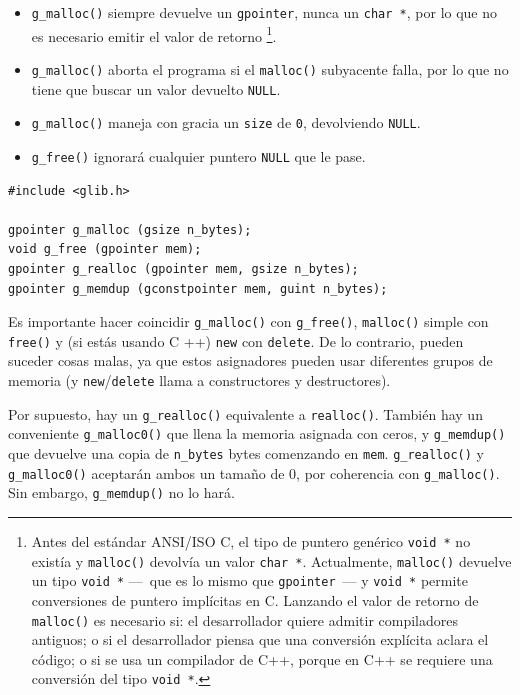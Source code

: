 \begin{itemize}
    \item \lstinline{g_malloc()} siempre devuelve un \lstinline{gpointer}, nunca un \lstinline{char *}, por lo que no es necesario emitir el valor de retorno \footnote{Antes del estándar ANSI/ISO C, el tipo de puntero genérico \lstinline{void *} no existía y \lstinline{malloc()} devolvía un valor \lstinline{char *}. Actualmente, \lstinline{malloc()} devuelve un tipo \lstinline{void *} ---~que es lo mismo que \lstinline{gpointer}~--- y \lstinline{void *} permite conversiones de puntero implícitas en C. Lanzando el valor de retorno de \lstinline{malloc()} es necesario si: el desarrollador quiere admitir compiladores antiguos; o si el desarrollador piensa que una conversión explícita aclara el código; o si se usa un compilador de C++, porque en C++ se requiere una conversión del tipo \lstinline{void *}.}.
    
    \item \lstinline{g_malloc()} aborta el programa si el \lstinline{malloc()} subyacente falla, por lo que no tiene que buscar un valor devuelto \lstinline{NULL}.
    
    \item \lstinline{g_malloc()} maneja con gracia un \lstinline{size} de \lstinline{0}, devolviendo \lstinline{NULL}.
    
    \item \lstinline{g_free()} ignorará cualquier puntero \lstinline{NULL} que le pase.
\end{itemize}

\begin{lstlisting}[style=GLib/GTK, caption={Asignación de memoria GLib}, label=glib-malloc-free]
#include <glib.h>

gpointer g_malloc (gsize n_bytes);
void g_free (gpointer mem);
gpointer g_realloc (gpointer mem, gsize n_bytes);
gpointer g_memdup (gconstpointer mem, guint n_bytes);
\end{lstlisting}

Es importante hacer coincidir \lstinline{g_malloc()} con \lstinline{g_free()}, \lstinline{malloc()} simple con \lstinline{free()} y (si estás usando C ++) \lstinline[style=GLib/GTK]{new} con \lstinline[style=GLib/GTK]{delete}. De lo contrario, pueden suceder cosas malas, ya que estos asignadores pueden usar diferentes grupos de memoria (y \lstinline[style=GLib/GTK]{new}/\lstinline[style=GLib/GTK]{delete} llama a constructores y destructores).

Por supuesto, hay un \lstinline{g_realloc()} equivalente a \lstinline{realloc()}. También hay un conveniente \lstinline{g_malloc0()} que llena la memoria asignada con ceros, y \lstinline{g_memdup()} que devuelve una copia de \lstinline{n_bytes} bytes comenzando en \lstinline{mem}. \lstinline{g_realloc()} y \lstinline{g_malloc0()} aceptarán ambos un tamaño de 0, por coherencia con \lstinline{g_malloc()}. Sin embargo, \lstinline{g_memdup()} no lo hará.

